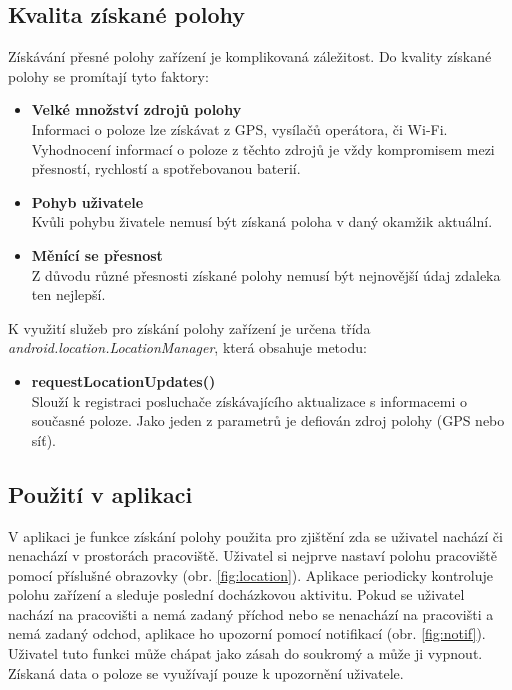 \documentclass{diplomka}
\begin{document}
\subsection*{Kvalita získané polohy}
Získávání přesné polohy zařízení je komplikovaná záležitost. Do kvality získané polohy se promítají tyto faktory:
\begin{itemize}[]
\item \textbf{Velké množství zdrojů polohy}\\
Informaci o poloze lze získávat z GPS, vysílačů operátora, či Wi-Fi. Vyhodnocení informací o poloze z těchto zdrojů je vždy kompromisem mezi přesností, rychlostí a spotřebovanou baterií.
\item \textbf{Pohyb uživatele}\\
Kvůli pohybu živatele nemusí být získaná poloha v daný okamžik aktuální.
\item \textbf{Měnící se přesnost}\\
Z důvodu různé přesnosti získané polohy nemusí být nejnovější údaj zdaleka ten nejlepší.
\end{itemize}
\noindent
K využití služeb pro získání polohy zařízení je určena třída\\ \emph{android.location.LocationManager}, která obsahuje metodu:
\begin{itemize}[]
\item \textbf{requestLocationUpdates()}\\
Slouží k registraci posluchače získávajícího aktualizace s informacemi o současné poloze. Jako jeden z parametrů je defiován zdroj polohy (GPS nebo síť).
\end{itemize}

\subsection*{Použití v aplikaci}
V aplikaci je funkce získání polohy použita pro zjištění zda se uživatel nachází či nenachází v prostorách pracoviště. Uživatel si nejprve nastaví polohu pracoviště pomocí příslušné obrazovky (obr. \ref{fig:location}). Aplikace periodicky kontroluje polohu zařízení a sleduje poslední docházkovou aktivitu. Pokud se uživatel nachází na pracovišti a nemá zadaný příchod nebo se nenachází na pracovišti a nemá zadaný odchod, aplikace ho upozorní pomocí notifikací (obr. \ref{fig:notif}). Uživatel tuto funkci může chápat jako zásah do soukromý a může ji vypnout. Získaná data o poloze se využívají pouze k upozornění uživatele.
\end{document}
